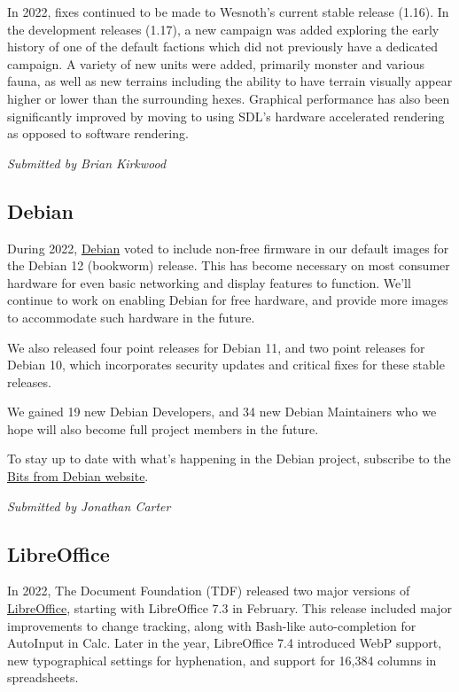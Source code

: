 \documentclass[a4paper]{report}
\begin{document}
In 2022, fixes continued to be made to Wesnoth's current stable release (1.16). In the development releases (1.17), a new campaign was added exploring the early history of one of the default factions which did not previously have a dedicated campaign. A variety of new units were added, primarily monster and various fauna, as well as new terrains including the ability to have terrain visually appear higher or lower than the surrounding hexes. Graphical performance has also been significantly improved by moving to using SDL's hardware accelerated rendering as opposed to software rendering.

{\em Submitted by Brian Kirkwood}

\subsection{Debian}

During 2022, \href{https://www.debian.org/}{Debian} voted to include non-free firmware in our default images for the Debian 12 (bookworm) release.  This has become necessary on most consumer hardware for even basic networking and display features to function. We'll continue to work on enabling Debian for free hardware, and provide more images to accommodate such hardware in the future.

We also released four point releases for Debian 11, and two point releases for Debian 10, which incorporates security updates and critical fixes for these stable releases.

We gained 19 new Debian Developers, and 34 new Debian Maintainers who we hope will also become full project members in the future.

To stay up to date with what's happening in the Debian project, subscribe to the \href{http://bits.debian.org/}{Bits from Debian website}.

{\em Submitted by Jonathan Carter}

\subsection{LibreOffice}

In 2022, The Document Foundation (TDF) released two major versions of \href{https://www.libreoffice.org/}{LibreOffice}, starting with LibreOffice 7.3 in February. This release included major improvements to change tracking, along with Bash-like auto-completion for AutoInput in Calc. Later in the year, LibreOffice 7.4 introduced WebP support, new typographical settings for hyphenation, and support for 16,384 columns in spreadsheets.
\end{document}

